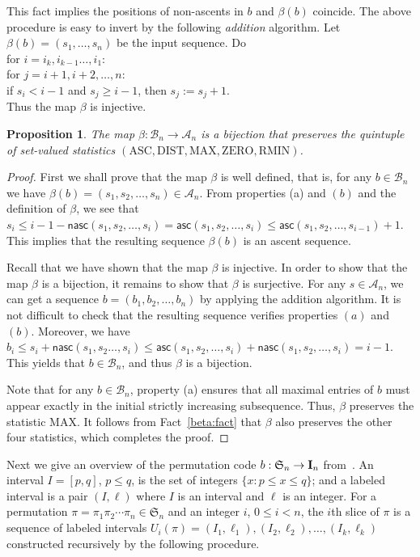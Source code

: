 \documentclass[12pt]{amsart}
\newcounter{mycount}
\theoremstyle{plain}
\newtheorem{proposition}[mycount]{Proposition}
\theoremstyle{definition}
\theoremstyle{example}
\theoremstyle{remark}
\numberwithin{equation}{section}
\numberwithin{figure}{section}
\newcommand{\asc}{\mathsf{asc}}
\def\nasc{\mathsf{nasc}}
\def\A{\mathcal{A}}
\def\I{\operatorname{{\bf I}}}
\def\B{ \mathcal{B}}
\def\DIST{\mathrm{DIST}}
\def\ASC{\mathrm{ASC}}
\def\RMIN{\mathrm{RMIN}}
\def\ZERO{\mathrm{ZERO}}
\def\MAX{\mathrm{MAX}}
\def\S{\mathfrak{S}}
\begin{document}
This fact implies the positions of non-ascents in $b$ and $\beta(b)$ coincide.   The above procedure is easy to invert by the following {\em addition} algorithm. Let $\beta(b)=(s_1,\ldots,s_n)$ be the input sequence. Do\\
\hspace*{0.5cm}  for $i=i_k, i_{k-1}\ldots, i_1$:\\
\hspace*{1cm}  for $j=i+1, i+2, \ldots, n$:\\
 \hspace*{1.5cm}  if $s_i<i-1$ and $s_j\geq i-1$, then $s_j:=s_j+1$.\\
Thus the map $\beta$ is injective.
\begin{proposition}\label{th2.1}
The map $\beta:\mathcal{B}_n\rightarrow\mathcal{A}_n$ is a bijection that preserves the quintuple of set-valued statistics
$(\ASC,\DIST,\MAX,\ZERO,\RMIN)$.
\end{proposition}

\begin{proof}
 First we shall prove that the map $\beta$ is well defined, that is, for any $b\in\B_n$ we have $\beta(b)=(s_1,s_2,\ldots, s_n)\in \A_n$. From    properties (a) and $(b)$ and the definition of $\beta$, we see that $s_i\leq i-1-\nasc(s_1,s_2,\ldots,s_{i})=\asc(s_1,s_2,\ldots, s_i)\leq \asc(s_1,s_2,\ldots, s_{i-1})+1$. This implies that the resulting sequence $\beta(b)$ is an ascent sequence.


 Recall that we have shown that the map $\beta$  is injective. In order to show that the map $\beta$ is a bijection, it remains to show that $\beta$ is surjective.  For any $s\in \A_n$, we can  get a sequence $b=(b_1,b_2,\ldots, b_n)$ by applying the addition algorithm.
 It is not difficult to check that the resulting sequence verifies properties $(a)$ and $(b)$. Moreover, we have $b_i\leq s_i+\nasc(s_1,s_2\ldots, s_{i})\leq \asc(s_1,s_2,\ldots,s_i)+\nasc(s_1,s_2,\ldots, s_{i})=i-1 $. This yields that   $b\in \B_n$, and thus $\beta$ is a bijection.

 Note that for any $b\in\B_n$, property (a) ensures that all  maximal entries of $b$ must appear exactly in the initial strictly increasing subsequence. Thus, $\beta$ preserves the statistic $\MAX$. It follows from Fact~\ref{beta:fact} that $\beta$ also preserves the other four statistics, which completes the proof.
 \end{proof}



Next we give an overview of the permutation code $b: \S_n\rightarrow\I_n$ from~\cite{bv}.
An interval $I=[p,q]$, $p\leq q$, is the set of integers $\{x: p\leq x\leq q\}$; and a labeled interval is  a pair $(I,\ell)$ where $I$ is an interval and $\ell$ is an integer.
For a permutation $\pi=\pi_1\pi_2\cdots \pi_n\in \S_n $ and an integer $i$,  $0\leq i<n$, the $i$th slice of $\pi$ is a sequence of labeled intervals
$U_i(\pi)=(I_1, \ell_1),(I_2, \ell_2),\ldots, (I_k, \ell_k)$ constructed recursively by the following procedure.
\end{document}
